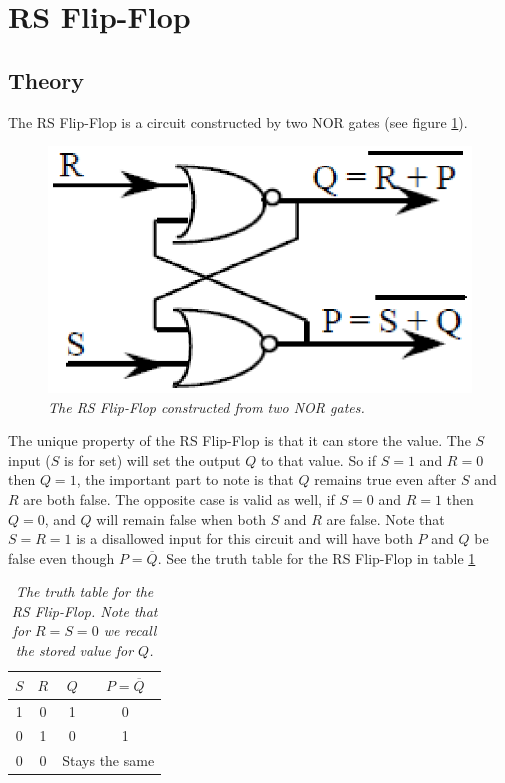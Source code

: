 \documentclass[11pt]{article}
\numberwithin{equation}{section}
\numberwithin{figure}{section}
\numberwithin{table}{section}
\begin{document}
\section{RS Flip-Flop}
\subsection{Theory}
The RS Flip-Flop is a circuit constructed by two NOR gates (see figure \ref{FigRSFlipFlop}). 
\begin{figure}[h]
\centering
\includegraphics[scale=0.60]{FigRSFlipFlop.eps}
\caption{\textit{The RS Flip-Flop constructed from two NOR gates.}}
\label{FigRSFlipFlop}
\end{figure}
The unique property of the RS Flip-Flop is that it can store the value. The $S$ input ($S$ is for set) will set the output $Q$ to that value. So if $S=1$ and $R=0$ then $Q=1$, the important part to note is that $Q$ remains true even after $S$ and $R$ are both false. The opposite case is valid as well, if $S=0$ and $R=1$ then $Q=0$, and $Q$ will remain false when both $S$ and $R$ are false. Note that $S=R=1$ is a disallowed input for this circuit and will have both $P$ and $Q$ be false even though $P=\overline{Q}$. See the truth table for the RS Flip-Flop in table \ref{TruthTabRS}
\begin{table}[h]
\centering
\begin{tabular}{cc|cc}
$S$	&$R$	&$Q$	&$P=\overline{Q}$\\
\hline
1	&0	&1	&0\\
0	&1	&0	&1\\
\hline
0	&0	&\multicolumn{2}{c}{Stays the same}
\end{tabular}
\caption{\textit{The truth table for the RS Flip-Flop. Note that for $R=S=0$ we recall the stored value for $Q$.}}
\label{TruthTabRS}
\end{table}
\end{document}
